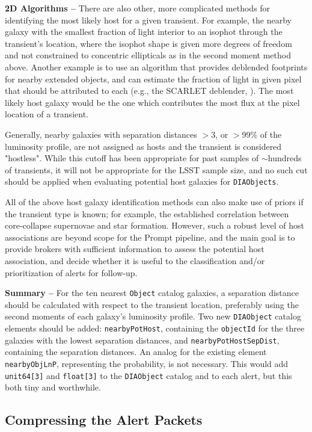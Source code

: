 \documentclass[DM,lsstdraft,authoryear,toc]{lsstdoc}
\begin{document}
{\bf 2D Algorithms --} There are also other, more complicated methods for identifying the most likely host for a given transient.
For example, the nearby galaxy with the smallest fraction of light interior to an isophot through the transient's location, where the isophot shape is given more degrees of freedom and not constrained to concentric ellipticals as in the second moment method above.
Another example is to use an algorithm that provides deblended footprints for nearby extended objects, and can estimate the fraction of light in given pixel that should be attributed to each (e.g., the SCARLET deblender, \cite{2018A&C....24..129M}).
The most likely host galaxy would be the one which contributes the most flux at the pixel location of a transient.

Generally, nearby galaxies with separation distances $>$3, or $>$99\% of the luminosity profile, are not assigned as hosts and the transient is considered "hostless".
While this cutoff has been appropriate for past samples of $\sim$hundreds of transients, it will not be appropriate for the LSST sample size, and no such cut should be applied when evaluating potential host galaxies for {\tt DIAObjects}. 

All of the above host galaxy identification methods can also make use of priors if the transient type is known; for example, the established correlation between core-collapse supernovae and star formation.
However, such a robust level of host associations are beyond scope for the Prompt pipeline, and the main goal is to provide brokers with sufficient information to assess the potential host association, and decide whether it is useful to the classification and/or prioritization of alerts for follow-up. 

{\bf Summary --} For the ten nearest {\tt Object} catalog galaxies, a separation distance should be calculated with respect to the transient location, preferably using the second moments of each galaxy's luminosity profile. Two new {\tt DIAObject} catalog elements should be added: {\tt nearbyPotHost}, containing the {\tt objectId} for the three galaxies with the lowest separation distances, and {\tt nearbyPotHostSepDist}, containing the separation distances. An analog for the existing element {\tt nearbyObjLnP}, representing the probability, is not necessary. This would add {\tt unit64[3]} and {\tt float[3]} to the {\tt DIAObject} catalog and to each alert, but this both tiny and worthwhile.

\subsection{Compressing the Alert Packets}\label{ssec:packets_compress}
\end{document}
